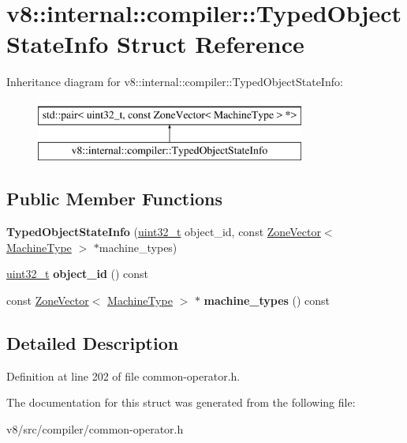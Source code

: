 \hypertarget{structv8_1_1internal_1_1compiler_1_1TypedObjectStateInfo}{}\section{v8\+:\+:internal\+:\+:compiler\+:\+:Typed\+Object\+State\+Info Struct Reference}
\label{structv8_1_1internal_1_1compiler_1_1TypedObjectStateInfo}
Inheritance diagram for v8\+:\+:internal\+:\+:compiler\+:\+:Typed\+Object\+State\+Info\+:\begin{figure}[H]
\begin{center}
\leavevmode
\includegraphics[height=2.000000cm]{structv8_1_1internal_1_1compiler_1_1TypedObjectStateInfo}
\end{center}
\end{figure}
\subsection*{Public Member Functions}
\begin{DoxyCompactItemize}
\item 
\mbox{\label{structv8_1_1internal_1_1compiler_1_1TypedObjectStateInfo_af6effa1059361ec004ec47a2dc419514}} 
{\bfseries Typed\+Object\+State\+Info} (\mbox{\hyperlink{classuint32__t}{uint32\+\_\+t}} object\+\_\+id, const \mbox{\hyperlink{classv8_1_1internal_1_1ZoneVector}{Zone\+Vector}}$<$ \mbox{\hyperlink{classv8_1_1internal_1_1MachineType}{Machine\+Type}} $>$ $\ast$machine\+\_\+types)
\item 
\mbox{\label{structv8_1_1internal_1_1compiler_1_1TypedObjectStateInfo_a3e5c3e85f16314eae815438121784d16}} 
\mbox{\hyperlink{classuint32__t}{uint32\+\_\+t}} {\bfseries object\+\_\+id} () const
\item 
\mbox{\label{structv8_1_1internal_1_1compiler_1_1TypedObjectStateInfo_afe05d341b12cbdd54f4ef10271312234}} 
const \mbox{\hyperlink{classv8_1_1internal_1_1ZoneVector}{Zone\+Vector}}$<$ \mbox{\hyperlink{classv8_1_1internal_1_1MachineType}{Machine\+Type}} $>$ $\ast$ {\bfseries machine\+\_\+types} () const
\end{DoxyCompactItemize}


\subsection{Detailed Description}


Definition at line 202 of file common-\/operator.\+h.



The documentation for this struct was generated from the following file\+:\begin{DoxyCompactItemize}
\item 
v8/src/compiler/common-\/operator.\+h\end{DoxyCompactItemize}
